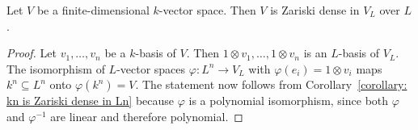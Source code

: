 \begin{corollary}
  \label{corollary: V is Zariski dense in VL}
  Let $V$ be a finite-dimensional $k$-vector space.
  Then $V$ is Zariski dense in $V_L$ over $L$.
\end{corollary}


\begin{proof}
  Let $v_1, \dotsc, v_n$ be a $k$-basis of $V$.
  Then $1 \otimes v_1, \dotsc, 1 \otimes v_n$ is an $L$-basis of $V_L$.
  The isomorphism of $L$-vector spaces $\varphi \colon L^n \to V_L$ with $\varphi(e_i) = 1 \otimes v_i$ maps $k^n \subseteq L^n$ onto $\varphi(k^n) = V$.
  The statement now follows from Corollary~\ref{corollary: kn is Zariski dense in Ln} because $\varphi$ is a polynomial isomorphism, since both $\varphi$ and $\varphi^{-1}$ are linear and therefore polynomial.
\end{proof}


